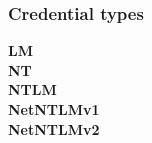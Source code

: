 \documentclass{article}
\begin{document}
\subsubsection{Credential types}
\textbf{LM}\\
\textbf{NT}\\
\textbf{NTLM}\\
\textbf{NetNTLMv1}\\
\textbf{NetNTLMv2}\\

\end{document}
